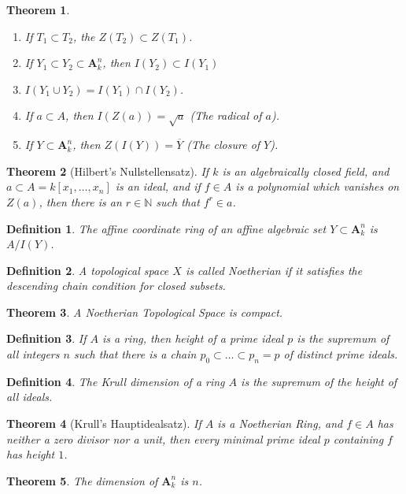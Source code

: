\documentclass[oneside]{book}
\theoremstyle{mystyle}
\newtheorem{theorem}{Theorem}[section]
\newtheorem{definition}{Definition}[section]
\begin{document}
\begin{theorem}
\
\begin{enumerate}
    \item If $T_1\subset T_2$, the  $Z(T_2)\subset Z(T_1)$.
    \item If $Y_1\subset Y_2 \subset \textbf{A}_k^n$, then $I(Y_2)\subset I(Y_1)$
    \item $I(Y_1\cup Y_2) = I(Y_1)\cap I(Y_2)$.
    \item If $a\subset A$, then $I(Z(a)) = \sqrt{a}$ (The radical of $a$).
    \item If $Y\subset \textbf{A}_k^n$, then $Z(I(Y)) = \overline{Y}$ (The closure of $Y$).
\end{enumerate}
\end{theorem}
\begin{theorem}[Hilbert's Nullstellensatz]
If $k$ is an algebraically closed field, and $a\subset A = k[x_1,\hdots ,x_n]$ is an ideal, and if $f\in A$ is a polynomial which vanishes on $Z(a)$, then there is an $r\in \mathbb{N}$ such that $f^r \in a$.
\end{theorem}
\begin{definition}
The affine coordinate ring of an affine algebraic set $Y\subset \textbf{A}_k^n$ is $A/I(Y)$.
\end{definition}
\begin{definition}
A topological space $X$ is called Noetherian if it satisfies the descending chain condition for closed subsets.
\end{definition}
\begin{theorem}
A Noetherian Topological Space is compact.
\end{theorem}
\begin{definition}
If $A$ is a ring, then height of a prime ideal $p$ is the supremum of all integers $n$ such that there is a chain $p_0\subset \hdots \subset p_n = p$ of distinct prime ideals.
\end{definition}
\begin{definition}
The Krull dimension of a ring $A$ is the supremum of the height of all ideals.
\end{definition}
\begin{theorem}[Krull's Hauptidealsatz]
If $A$ is a Noetherian Ring, and $f\in A$ has neither a zero divisor nor a unit, then every minimal prime ideal $p$ containing $f$ has height $1$.
\end{theorem}
\begin{theorem}
The dimension of $\textbf{A}_k^n$ is $n$.
\end{theorem}
\end{document}
